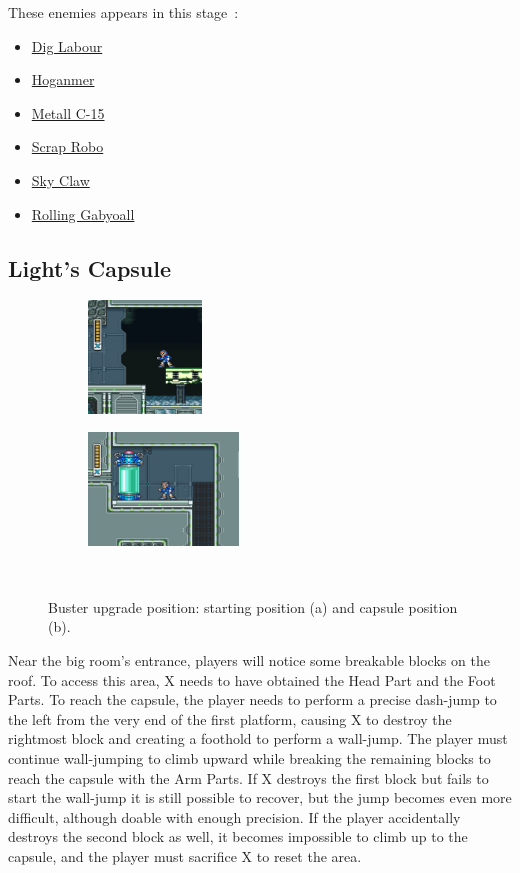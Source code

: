 These enemies appears in this stage~\cite{wiki:Factory}:
\begin{itemize}
	\item \hyperlink{enem:Dig_Labour}{Dig Labour} 
	\item \hyperlink{enem:Hoganmer}{Hoganmer}
	\item \hyperlink{enem:Metall_C-15}{Metall C-15}
	\item \hyperlink{enem:Scrap_Robo}{Scrap Robo}
	\item \hyperlink{enem:Sky_Claw}{Sky Claw}
	\item \hyperlink{enem:Rolling_Gabyoall}{Rolling Gabyoall}
\end{itemize}

\subsection{Light's Capsule}
\begin{figure}[htp]
	\centering
	\begin{subfigure}{0.3\textwidth}
		\centering
		\includegraphics[height=3cm]{figures/X1/Flame_mammoth/Flame_armor_1.jpg}
		\caption{}
	\end{subfigure}
	\begin{subfigure}{0.35\textwidth}
		\centering
		\includegraphics[height=3cm]{figures/X1/Flame_mammoth/Flame_armor_2.jpg}
		\caption{}
	\end{subfigure}\\
	\caption{Buster upgrade position: starting position (a) and capsule position (b).}
\end{figure}

Near the big room's entrance, players will notice some breakable blocks on the roof. To access this area, X needs to have obtained the Head Part and the Foot Parts. To reach the capsule, the player needs to perform a precise dash-jump to the left from the very end of the first platform, causing X to destroy the rightmost block and creating a foothold to perform a wall-jump. The player must continue wall-jumping to climb upward while breaking the remaining blocks to reach the capsule with the Arm Parts. If X destroys the first block but fails to start the wall-jump it is still possible to recover, but the jump becomes even more difficult, although doable with enough precision. If the player accidentally destroys the second block as well, it becomes impossible to climb up to the capsule, and the player must sacrifice X to reset the area.

